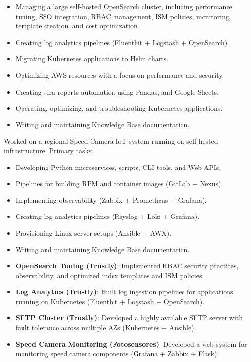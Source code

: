 \documentclass[10pt,a4paper]{altacv}
\begin{document}
\bigskip

\begin{itemize}
    \item Managing a large self-hosted OpenSearch cluster, including performance tuning, SSO integration, RBAC management, ISM policies, monitoring, template creation, and cost optimization.
    \item Creating log analytics pipelines (Fluentbit + Logstash + OpenSearch).
    \item Migrating Kubernetes applications to Helm charts.
    \item Optimizing AWS resources with a focus on performance and security.
    \item Creating Jira reports automation using Pandas, and Google Sheets.
    \item Operating, optimizing, and troubleshooting Kubernetes applications.
    \item Writing and maintaining Knowledge Base documentation.
\end{itemize}

\divider


Worked on a regional Speed Camera IoT system running on self-hosted infrastructure. Primary tasks:

\bigskip

\begin{itemize}
    \item Developing Python microservices, scripts, CLI tools, and Web APIs.
    \item Pipelines for building RPM and container images (GitLab + Nexus).  
    \item Implementing observability (Zabbix + Prometheus + Grafana).  
    \item Creating log analytics pipelines (Rsyslog + Loki + Grafana).  
    \item Provisioning Linux server setups (Ansible + AWX).  
    \item Writing and maintaining Knowledge Base documentation.  
\end{itemize}

\bigskip
\bigskip


\begin{itemize}
    \item \textbf{OpenSearch Tuning (Trustly)}: Implemented RBAC security practices, observability, and optimized index templates and ISM policies.
    \item \textbf{Log Analytics (Trustly)}: Built log ingestion pipelines for applications running on Kubernetes (Fluentbit + Logstash + OpenSearch).
    \item \textbf{SFTP Cluster (Trustly)}: Developed a highly available SFTP server with fault tolerance across multiple AZs (Kubernetes + Ansible).
    \item \textbf{Speed Camera Monitoring (Fotosensores)}: Developed a web system for monitoring speed camera components (Grafana + Zabbix + Flask).
\end{itemize}


\clearpage
\end{document}
